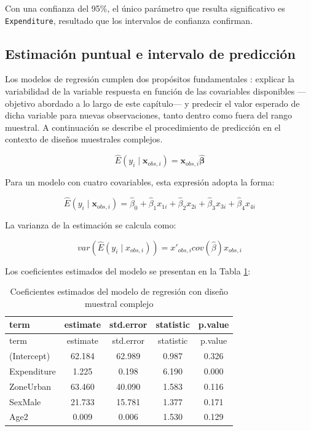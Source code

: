 \documentclass[
  spanish,
  12pt,
]{book}
\begin{document}
Con una confianza del 95\%, el único parámetro que resulta significativo es \texttt{Expenditure}, resultado que los intervalos de confianza confirman.

\subsection{Estimación puntual e intervalo de predicción}\label{estimaciuxf3n-puntual-e-intervalo-de-predicciuxf3n}

Los modelos de regresión cumplen dos propósitos fundamentales \citep{heeringa2017applied}: explicar la variabilidad de la variable respuesta en función de las covariables disponibles ---objetivo abordado a lo largo de este capítulo--- y predecir el valor esperado de dicha variable para nuevas observaciones, tanto dentro como fuera del rango muestral. A continuación se describe el procedimiento de predicción en el contexto de diseños muestrales complejos.

\[
\hat{E}(y_{i}\mid\boldsymbol{x}_{obs,i})=\boldsymbol{x}_{obs,i}\hat{\boldsymbol{\beta}}
\]

Para un modelo con cuatro covariables, esta expresión adopta la forma:

\[
\hat{E}(y_{i}\mid\boldsymbol{x}_{obs,i})=\hat{\beta}_{0}+\hat{\beta}_{1}x_{1i}+\hat{\beta}_{2}x_{2i}+\hat{\beta}_{3}x_{3i}+\hat{\beta}_{4}x_{4i}
\]

La varianza de la estimación se calcula como:

\[
var\left(\hat{E}\left(y_{i}\mid x_{obs,i}\right)\right)
=  x'_{obs,i}cov\left(\hat{\beta}\right)x{}_{obs,i}
\]

Los coeficientes estimados del modelo se presentan en la Tabla \ref{tab:tab-coeficientes-modelo}:

\begin{longtable}[]{@{}lcccc@{}}
\caption{\label{tab:tab-coeficientes-modelo}Coeficientes estimados del modelo de regresión con diseño muestral complejo}\tabularnewline
\toprule\noalign{}
term & estimate & std.error & statistic & p.value \\
\midrule\noalign{}
\endfirsthead
\toprule\noalign{}
term & estimate & std.error & statistic & p.value \\
\midrule\noalign{}
\endhead
\bottomrule\noalign{}
\endlastfoot
(Intercept) & 62.184 & 62.989 & 0.987 & 0.326 \\
Expenditure & 1.225 & 0.198 & 6.190 & 0.000 \\
ZoneUrban & 63.460 & 40.090 & 1.583 & 0.116 \\
SexMale & 21.733 & 15.781 & 1.377 & 0.171 \\
Age2 & 0.009 & 0.006 & 1.530 & 0.129 \\
\end{longtable}
\end{document}
